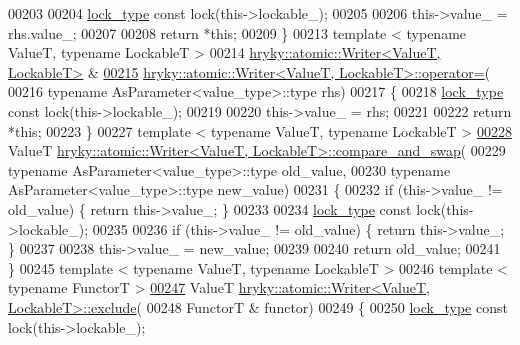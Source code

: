 \begin{DoxyCode}
{00203     
00204     \hyperlink{classhryky_1_1exclusion_1_1_lock}{lock_type} \textcolor{keyword}{const} lock(this->lockable\_);
00205 
00206     this->value\_ = rhs.value\_;
00207 
00208     \textcolor{keywordflow}{return} *\textcolor{keyword}{this};
00209 \}
00213 \textcolor{keyword}{template} < \textcolor{keyword}{typename} ValueT, \textcolor{keyword}{typename} LockableT >
00214 \hyperlink{classhryky_1_1atomic_1_1_writer}{hryky::atomic::Writer<ValueT, LockableT>} & 
\hypertarget{atomic__writer_8h_source_l00215}{}\hyperlink{group__atomic__operation_gabe02d1a1584c488c8b71e49ff212235e}{00215} \hyperlink{classhryky_1_1atomic_1_1_writer}{hryky::atomic::Writer<ValueT, LockableT>::operator=}(
00216     \textcolor{keyword}{typename} AsParameter<value\_type>::type rhs)
00217 \{
00218     \hyperlink{classhryky_1_1exclusion_1_1_lock}{lock_type} \textcolor{keyword}{const} lock(this->lockable\_);
00219 
00220     this->value\_ = rhs;
00221 
00222     \textcolor{keywordflow}{return} *\textcolor{keyword}{this};
00223 \}
00227 \textcolor{keyword}{template} < \textcolor{keyword}{typename} ValueT, \textcolor{keyword}{typename} LockableT >
\hypertarget{atomic__writer_8h_source_l00228}{}\hyperlink{group__atomic__operation_ga39b7ebbb7b13b8b1a0b05a4e04f4176f}{00228} ValueT \hyperlink{classhryky_1_1atomic_1_1_writer}{hryky::atomic::Writer<ValueT, LockableT>::compare_and_swap}(
00229     \textcolor{keyword}{typename} AsParameter<value\_type>::type old\_value,
00230     \textcolor{keyword}{typename} AsParameter<value\_type>::type new\_value)
00231 \{
00232     \textcolor{keywordflow}{if} (this->value\_ != old\_value) \{ \textcolor{keywordflow}{return} this->value\_; \}
00233     
00234     \hyperlink{classhryky_1_1exclusion_1_1_lock}{lock_type} \textcolor{keyword}{const} lock(this->lockable\_);
00235 
00236     \textcolor{keywordflow}{if} (this->value\_ != old\_value) \{ \textcolor{keywordflow}{return} this->value\_; \}
00237 
00238     this->value\_ = new\_value;
00239 
00240     \textcolor{keywordflow}{return} old\_value;
00241 \}
00245 \textcolor{keyword}{template} < \textcolor{keyword}{typename} ValueT, \textcolor{keyword}{typename} LockableT >
00246 \textcolor{keyword}{template} < \textcolor{keyword}{typename} FunctorT >
\hypertarget{atomic__writer_8h_source_l00247}{}\hyperlink{group__atomic__operation_gae595f32af60a397c190c0d02fd5da565}{00247} ValueT \hyperlink{classhryky_1_1atomic_1_1_writer}{hryky::atomic::Writer<ValueT, LockableT>::exclude}(
00248     FunctorT & functor)
00249 \{
00250     \hyperlink{classhryky_1_1exclusion_1_1_lock}{lock_type} \textcolor{keyword}{const} lock(this->lockable\_);
}
\end{DoxyCode}
